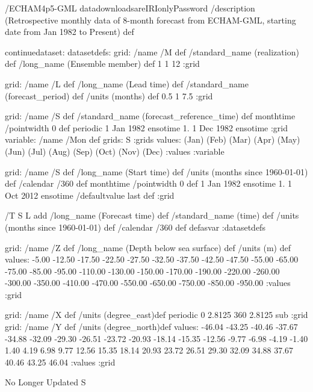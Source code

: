 \begin{ingrid}
/ECHAM4p5-GML datadownloadsareIRIonlyPassword
/description (Retrospective monthly data of 8-month forecast from ECHAM-GML, starting date from Jan 1982 to Present) def



continuedataset:
datasetdefs:
grid:
/name /M def
/standard_name (realization) def
/long_name (Ensemble member) def
1 1 12
:grid

grid:
/name /L def
/long_name (Lead time) def
/standard_name (forecast_period) def
/units (months) def
0.5 1 7.5
:grid
\end{ingrid}
grid:
/name /S def
/standard_name (forecast_reference_time) def
monthtime
/pointwidth 0 def
periodic
1 Jan 1982 ensotime
1.
1 Dec 1982 ensotime
:grid
variable:
/name /Mon def
grids: S :grids
values:
(Jan)
(Feb)
(Mar)
(Apr)
(May)
(Jun)
(Jul)
(Aug)
(Sep)
(Oct)
(Nov)
(Dec)
:values
:variable
\begin{ingrid}
grid:
/name /S def
/long_name (Start time) def
/units (months since 1960-01-01) def
/calendar /360 def
monthtime
/pointwidth 0 def 
1 Jan 1982 ensotime
1.
1 Oct 2012 ensotime
/defaultvalue {last} def
:grid

/T { 
S L add
/long_name (Forecast time) def
/standard_name (time) def
/units (months since 1960-01-01) def
/calendar /360 def
 }defasvar
:datasetdefs

grid:
/name /Z def
/long_name (Depth below sea surface) def
/units (m) def
values: 
    -5.00   -12.50   -17.50   -22.50   -27.50
   -32.50   -37.50   -42.50   -47.50   -55.00
   -65.00   -75.00   -85.00   -95.00  -110.00
  -130.00  -150.00  -170.00  -190.00  -220.00
  -260.00  -300.00  -350.00  -410.00  -470.00
  -550.00  -650.00  -750.00  -850.00  -950.00
:values
:grid

grid:
/name /X def
/units (degree_east)def
 periodic
 0 2.8125 360  2.8125 sub
:grid
grid:
/name /Y def
/units (degree_north)def
values:
-46.04 -43.25 -40.46
 -37.67 -34.88 -32.09 -29.30 -26.51 -23.72 -20.93 -18.14 -15.35 -12.56
 -9.77  -6.98  -4.19  -1.40   1.40   4.19   6.98   9.77  12.56  15.35
 18.14  20.93  23.72  26.51  29.30  32.09  34.88  37.67  40.46  43.25
 46.04
:values
:grid
\end{ingrid}
No Longer Updated
S
